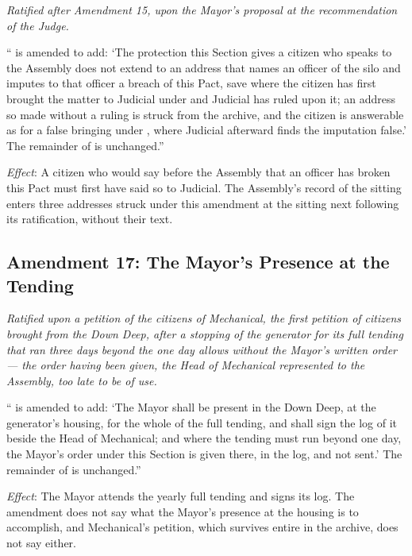 \textit{Ratified after Amendment 15, upon the Mayor's proposal at the recommendation of the Judge.}

`` is amended to add: `The protection this Section gives a citizen who speaks to the Assembly does not extend to an address that names an officer of the silo and imputes to that officer a breach of this Pact, save where the citizen has first brought the matter to Judicial under  and Judicial has ruled upon it; an address so made without a ruling is struck from the archive, and the citizen is answerable as for a false bringing under , where Judicial afterward finds the imputation false.' The remainder of  is unchanged.''

\textit{Effect}: A citizen who would say before the Assembly that an officer has broken this Pact must first have said so to Judicial. The Assembly's record of the sitting enters three addresses struck under this amendment at the sitting next following its ratification, without their text.

\subsection*{Amendment 17: The Mayor's Presence at the Tending}

\textit{Ratified upon a petition of the citizens of Mechanical, the first petition of citizens brought from the Down Deep, after a stopping of the generator for its full tending that ran three days beyond the one day  allows without the Mayor's written order --- the order having been given, the Head of Mechanical represented to the Assembly, too late to be of use.}

`` is amended to add: `The Mayor shall be present in the Down Deep, at the generator's housing, for the whole of the full tending, and shall sign the log of it beside the Head of Mechanical; and where the tending must run beyond one day, the Mayor's order under this Section is given there, in the log, and not sent.' The remainder of  is unchanged.''

\textit{Effect}: The Mayor attends the yearly full tending and signs its log. The amendment does not say what the Mayor's presence at the housing is to accomplish, and Mechanical's petition, which survives entire in the archive, does not say either.


